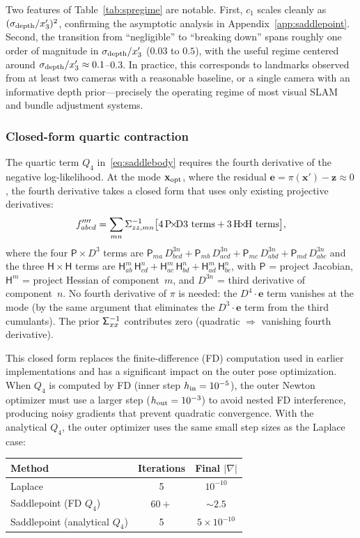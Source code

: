 \documentclass[journal]{IEEEtran}
\newcommand{\sfSigma}[1]{\mathsf{\Sigma}_\mathnormal{#1}}
\newcommand{\beq}{\begin{equation}}
\newcommand{\eeq}{\end{equation}}
\begin{document}
Two features of Table~\ref{tab:spregime} are notable.
First, $c_1$ scales cleanly as 
$(\sigma_{\rm depth}/x_3')^2$, confirming the 
asymptotic analysis in Appendix~\ref{app:saddlepoint}.
Second, the transition from ``negligible'' to
``breaking down'' spans roughly one order of magnitude
in $\sigma_{\rm depth}/x_3'$ ($0.03$ to $0.5$), with the
useful regime centered around $\sigma_{\rm depth}/x_3' \approx 0.1$--$0.3$.
In practice, this corresponds to landmarks observed from
at least two cameras with a reasonable baseline, or a single
camera with an informative depth prior---precisely the
operating regime of most visual SLAM and bundle adjustment systems.

\subsubsection{Closed-form quartic contraction}

The quartic term $Q_4$ in~\eqref{eq:saddlebody} requires
the fourth derivative of the negative log-likelihood.
At the mode $\mathbf{x}_{\rm opt}$, where the residual
$\mathbf{e} = \pi(\mathbf{x}') - \mathbf{z} \approx 0$,
the fourth derivative takes a closed form that uses only
existing projective derivatives:
\beq
    f''''_{abcd} = \sum_{mn} \Sigma^{-1}_{zz,mn} \bigl[
    4\,\text{P\!$\times$\!D3 terms} + 3\,\text{H\!$\times$\!H terms}
    \bigr],
    \label{eq:f4closedform}
\eeq
where the four $\mathsf{P} \times D^3$ terms are
$\mathsf{P}_{ma}\,D^{3n}_{bcd} + \mathsf{P}_{mb}\,D^{3n}_{acd}
+ \mathsf{P}_{mc}\,D^{3n}_{abd} + \mathsf{P}_{md}\,D^{3n}_{abc}$
and the three $\mathsf{H} \times \mathsf{H}$ terms are
$\mathsf{H}^m_{ab}\,\mathsf{H}^n_{cd}
+ \mathsf{H}^m_{ac}\,\mathsf{H}^n_{bd}
+ \mathsf{H}^m_{ad}\,\mathsf{H}^n_{bc}$,
with $\mathsf{P}$ = project Jacobian,
$\mathsf{H}^m$ = project Hessian of component~$m$,
and $D^{3n}$ = third derivative of component~$n$.
No fourth derivative of $\pi$ is needed:
the $D^4 \cdot \mathbf{e}$ term vanishes at the mode
(by the same argument that eliminates the $D^3 \cdot \mathbf{e}$
term from the third cumulants).
The prior $\sfSigma{xx}^{-1}$ contributes zero
(quadratic $\Rightarrow$ vanishing fourth derivative).

This closed form replaces the finite-difference (FD)
computation used in earlier implementations and has a
significant impact on the outer pose optimization.
When $Q_4$ is computed by FD (inner step $h_{\rm in} = 10^{-5}$),
the outer Newton optimizer must use a larger step
($h_{\rm out} = 10^{-3}$) to avoid nested FD interference,
producing noisy gradients that prevent quadratic convergence.
With the analytical $Q_4$, the outer optimizer uses the same
small step sizes as the Laplace case:
\begin{center}
\begin{tabular}{l|c|c}
Method & Iterations & Final $|\nabla|$ \\
\hline
Laplace & 5 & $10^{-10}$ \\
Saddlepoint (FD $Q_4$) & $60+$ & $\sim\!2.5$ \\
Saddlepoint (analytical $Q_4$) & 5 & $5 \times 10^{-10}$
\end{tabular}
\end{center}
\end{document}
